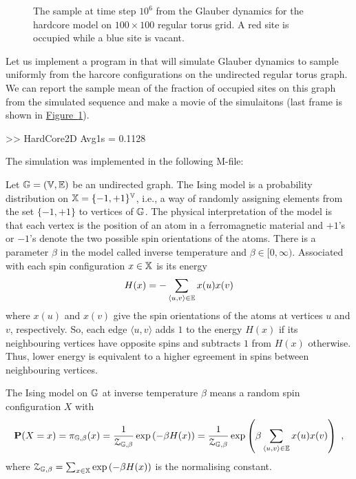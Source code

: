 \begin{figure}[htpb]
\caption{The sample at time step $10^6$ from the Glauber dynamics for the hardcore model on $100\times 100$ regular torus grid.  A red site is occupied while a blue site is vacant.\label{F:HardCore2D100x100Torus}}
\centering   {}
\end{figure}

\begin{simulation}
Let us implement a program in \Matlab that will simulate Glauber dynamics to sample uniformly from the harcore configurations on the undirected regular torus graph. 
We can report the sample mean of the fraction of occupied sites on this graph from the simulated sequence and make a movie of the simulaitons (last frame is shown in \hyperref[F:HardCore2D100x100Torus]{Figure~\ref*{F:HardCore2D100x100Torus}}).
\begin{VrbM}
>> HardCore2D
Avg1s =    0.1128
\end{VrbM}
The simulation was implemented in the following M-file:
\end{simulation}


\begin{model}\label{M:GlauberDynamicsIsing}
Let $\mathbb{G} = (\mathbb{V},\mathbb{E})$ be an undirected graph.  
The Ising model is a probability distribution on $\mathbb{X} = \{-1,+1\}^{\mathbb{V}}$, i.e., a way of randomly assigning elements from the set $\{-1,+1\}$ to vertices of $\mathbb{G}$.  
The physical interpretation of the model is that each vertex is the position of an atom in a ferromagnetic material and $+1$'s or $-1$'s denote the two possible spin orientations of the atoms.  
There is a parameter $\beta$ in the model called inverse temperature and $\beta \in [0,\infty)$.  
Associated with each spin configuration $x \in \mathbb{X}$ is its energy
\[
H(x) = - \sum_{\langle u, v \rangle \in \mathbb{E}} x(u) x(v) 
\]
where $x(u)$ and $x(v)$ give the spin orientations of the atoms at vertices $u$ and $v$, respectively.  
So, each edge $\langle u, v \rangle$ adds $1$ to the energy $H(x)$ if its neighbouring vertices have opposite spins and subtracts $1$ from $H(x)$ otherwise.  
Thus, lower energy is equivalent to a higher egreement in spins between neighbouring vertices.  

The Ising model on $\mathbb{G}$ at inverse temperature $\beta$ means a random spin configuration $X$ with
\[
\mathbf{P}(X=x) = \pi_{\mathbb{G},\beta}(x) = \frac{1}{\mathcal{Z}_{\mathbb{G},\beta}} \exp{\left(- \beta H(x)\right)} 
=  \frac{1}{\mathcal{Z}_{\mathbb{G},\beta}} \exp{\left(\beta \sum_{\langle u, v \rangle \in \mathbb{E}} x(u) x(v)  \right)} \enspace , 
\]
where $\mathcal{Z}_{\mathbb{G},\beta}= \sum_{x \in \mathbb{X}}\exp{\left(- \beta H(x)\right)}$ is the normalising constant.
\end{model}

